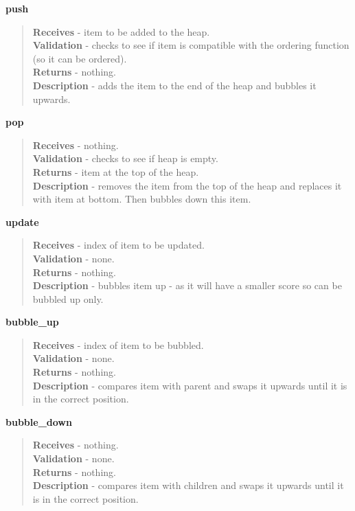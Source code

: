 \documentclass[titlepage]{article}
\begin{document}
\textbf{push}
\begin{quote}
\textbf{Receives} - item to be added to the heap. \\
\textbf{Validation} - checks to see if item is compatible with the ordering function (so it can be ordered).\\
\textbf{Returns} - nothing. \\
\textbf{Description} - adds the item to the end of the heap and bubbles it upwards.
\end{quote}

\textbf{pop}
\begin{quote}
\textbf{Receives} - nothing. \\
\textbf{Validation} - checks to see if heap is empty.\\
\textbf{Returns} - item at the top of the heap. \\
\textbf{Description} - removes the item from the top of the heap and replaces it with item at bottom. Then bubbles down this item.
\end{quote}

\textbf{update}
\begin{quote}
\textbf{Receives} - index of item to be updated. \\
\textbf{Validation} - none.\\
\textbf{Returns} - nothing. \\
\textbf{Description} - bubbles item up - as it will have a smaller score so can be bubbled up only.
\end{quote}

\textbf{bubble\_up}
\begin{quote}
\textbf{Receives} - index of item to be bubbled. \\
\textbf{Validation} - none.\\
\textbf{Returns} - nothing. \\
\textbf{Description} - compares item with parent and swaps it upwards until it is in the correct position.
\end{quote}

\textbf{bubble\_down}
\begin{quote}
\textbf{Receives} - nothing. \\
\textbf{Validation} - none.\\
\textbf{Returns} - nothing. \\
\textbf{Description} - compares item with children and swaps it upwards until it is in the correct position.
\end{quote}
\end{document}

